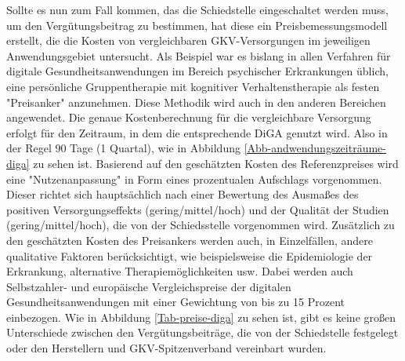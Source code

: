\documentclass{article}
\begin{document}
			Sollte es nun zum Fall kommen, das die Schiedstelle eingeschaltet werden muss, um den Vergütungsbeitrag zu bestimmen, hat diese ein Preisbemessungsmodell erstellt, die die Kosten von vergleichbaren GKV-Versorgungen im jeweiligen Anwendungsgebiet untersucht. Als Beispiel war es bislang in allen Verfahren für digitale Gesundheitsanwendungen im Bereich psychischer Erkrankungen üblich, eine persönliche Gruppentherapie mit kognitiver Verhaltenstherapie als festen "Preisanker" anzunehmen. Diese Methodik wird auch in den anderen Bereichen angewendet. Die genaue Kostenberechnung für die vergleichbare Versorgung erfolgt für den Zeitraum, in dem die entsprechende DiGA genutzt wird.\cite[vgl. S. 13]{TK-Report-2} Also in der Regel 90 Tage (1 Quartal), wie in Abbildung \ref{Abb-andwendungszeiträume-diga} zu sehen ist. Basierend auf den geschätzten Kosten des Referenzpreises wird eine "Nutzenanpassung" in Form eines prozentualen Aufschlags vorgenommen. Dieser richtet sich hauptsächlich nach einer Bewertung des Ausmaßes des positiven Versorgungseffekts (gering/mittel/hoch) und der Qualität der Studien (gering/mittel/hoch), die von der Schiedsstelle vorgenommen wird. Zusätzlich zu den geschätzten Kosten des Preisankers werden auch, in Einzelfällen, andere qualitative Faktoren berücksichtigt, wie beispielsweise die Epidemiologie der Erkrankung, alternative Therapiemöglichkeiten usw. Dabei werden auch Selbstzahler- und europäische Vergleichspreise der digitalen Gesundheitsanwendungen mit einer Gewichtung von bis zu 15 Prozent einbezogen.\cite[vgl. S. 13]{TK-Report-2} Wie in Abbildung \ref{Tab-preise-diga} zu sehen ist, gibt es keine großen Unterschiede zwischen den Vergütungsbeiträge, die von der Schiedstelle festgelegt oder den Herstellern und GKV-Spitzenverband vereinbart wurden. 
\end{document}
